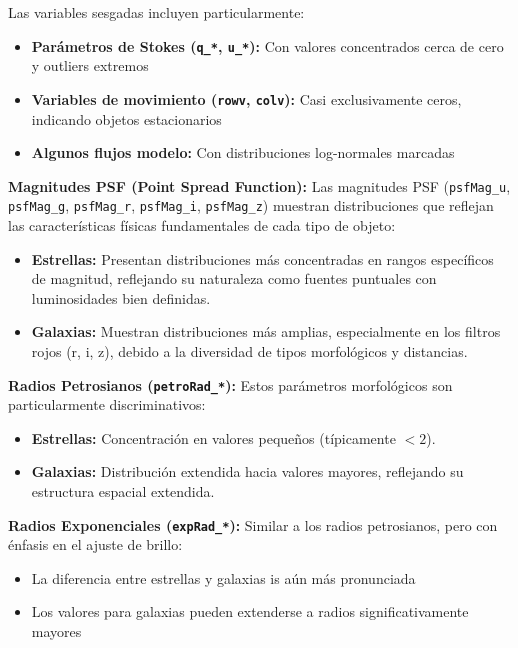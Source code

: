 \documentclass{article}
\begin{document}
Las variables sesgadas incluyen particularmente:
\begin{itemize}
    \item \textbf{Parámetros de Stokes (\texttt{q\_*}, \texttt{u\_*}):} Con valores concentrados cerca de cero y outliers extremos
    \item \textbf{Variables de movimiento (\texttt{rowv}, \texttt{colv}):} Casi exclusivamente ceros, indicando objetos estacionarios
    \item \textbf{Algunos flujos modelo:} Con distribuciones log-normales marcadas
\end{itemize}

\textbf{Magnitudes PSF (Point Spread Function):}
Las magnitudes PSF (\texttt{psfMag\_u}, \texttt{psfMag\_g}, \texttt{psfMag\_r}, \texttt{psfMag\_i}, \texttt{psfMag\_z}) muestran distribuciones que reflejan las características físicas fundamentales de cada tipo de objeto:

\begin{itemize}
    \item \textbf{Estrellas:} Presentan distribuciones más concentradas en rangos específicos de magnitud, reflejando su naturaleza como fuentes puntuales con luminosidades bien definidas.
    \item \textbf{Galaxias:} Muestran distribuciones más amplias, especialmente en los filtros rojos (r, i, z), debido a la diversidad de tipos morfológicos y distancias.
\end{itemize}

\textbf{Radios Petrosianos (\texttt{petroRad\_*}):}
Estos parámetros morfológicos son particularmente discriminativos:

\begin{itemize}
    \item \textbf{Estrellas:} Concentración en valores pequeños (típicamente $< 2$).
    \item \textbf{Galaxias:} Distribución extendida hacia valores mayores, reflejando su estructura espacial extendida.
\end{itemize}

\textbf{Radios Exponenciales (\texttt{expRad\_*}):}
Similar a los radios petrosianos, pero con énfasis en el ajuste de brillo:

\begin{itemize}
    \item La diferencia entre estrellas y galaxias is aún más pronunciada
    \item Los valores para galaxias pueden extenderse a radios significativamente mayores
\end{itemize}
\end{document}
